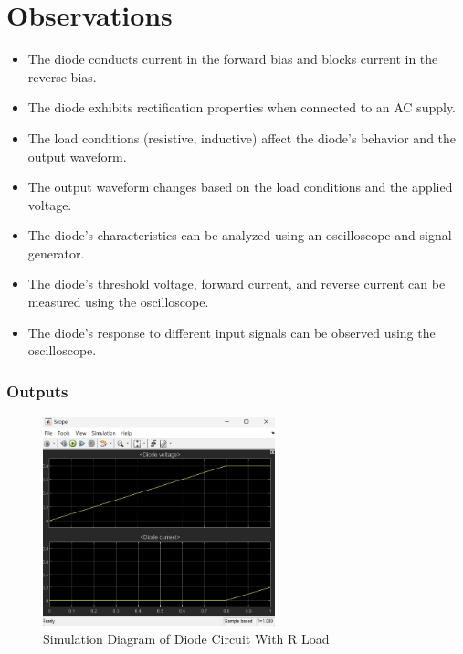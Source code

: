 \documentclass[12pt]{article}
\begin{document}
\section*{Observations}
\begin{itemize}
    \item The diode conducts current in the forward bias and blocks current in the reverse bias.
    \item The diode exhibits rectification properties when connected to an AC supply.
    \item The load conditions (resistive, inductive) affect the diode's behavior and the output waveform.
    \item The output waveform changes based on the load conditions and the applied voltage.
    \item The diode's characteristics can be analyzed using an oscilloscope and signal generator.
    \item The diode's threshold voltage, forward current, and reverse current can be measured using the oscilloscope.
    \item The diode's response to different input signals can be observed using the oscilloscope.
\end{itemize}
\subsubsection*{Outputs}
\begin{figure}[H]
    \centering
    \includegraphics[width=0.6\textwidth]{Rwave.jpg}
    \caption{Simulation Diagram of Diode Circuit With R Load}
    \label{fig:simulation_diagram}
\end{figure}
\end{document}
